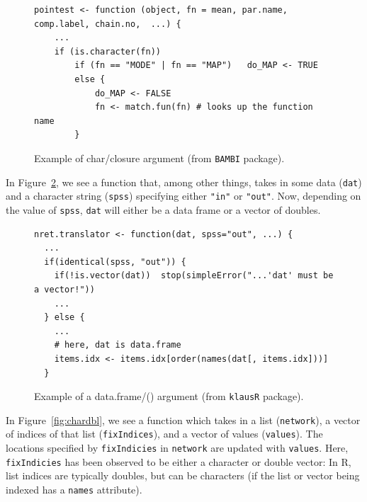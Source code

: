 \documentclass[acmsmall,10pt,review,anonymous]{acmart}\settopmatter{printfolios=true,printccs=false,printacmref=false}
\begin{document}
\begin{figure}[!hb]{\small\begin{lstlisting}[style=R]
pointest <- function (object, fn = mean, par.name, comp.label, chain.no,  ...) {
    ...
    if (is.character(fn))
        if (fn == "MODE" | fn == "MAP")   do_MAP <- TRUE
        else {
            do_MAP <- FALSE
            fn <- match.fun(fn) # looks up the function name
        }
\end{lstlisting}}\caption{Example of char/closure argument (from {\tt BAMBI} package).}\label{fig:charclos}\end{figure}

  In Figure~\ref{fig:dfdbl}, we see a
function that, among other things, takes in some data ({\tt dat}) and a
character string ({\tt spss}) specifying either {\tt "in"} or {\tt "out"}.
Now, depending on the value of {\tt spss}, {\tt dat} will either be a data
frame or a vector of doubles.

\begin{figure}[!hb]{\small\begin{lstlisting}[style=R]
nret.translator <- function(dat, spss="out", ...) {
  ...
  if(identical(spss, "out")) {
    if(!is.vector(dat))  stop(simpleError("...'dat' must be a vector!"))
    ...
  } else {
    ...
    # here, dat is data.frame
    items.idx <- items.idx[order(names(dat[, items.idx]))]
  }
\end{lstlisting}}\caption{Example of a data.frame/(\D) argument (from {\tt klausR} package).}\label{fig:dfdbl}\end{figure}

In Figure~\ref{fig:chardbl}, we see a function which takes in a list ({\tt network}), a vector of indices of that list ({\tt fixIndices}), and a
vector of values ({\tt values}).  The locations specified by {\tt fixIndicies} in {\tt network} are updated with {\tt values}.  Here, {\tt fixIndicies} has been observed to be either a character or double vector:
In R, list indices are typically doubles, but can be characters (if the list
or vector being indexed has a {\tt names} attribute).
\end{document}

